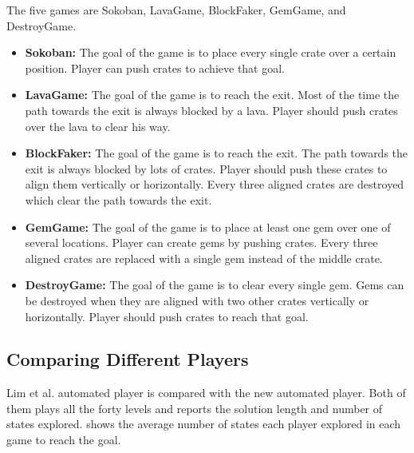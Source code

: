 
The five games are Sokoban, LavaGame, BlockFaker, GemGame, and DestroyGame.
\begin{itemize} \itemsep0pt \parskip0pt 
	\item \textbf{Sokoban:} The goal of the game is to place every single crate over a certain position. Player can push crates to achieve that goal.
	\item \textbf{LavaGame:} The goal of the game is to reach the exit. Most of the time the path towards the exit is always blocked by a lava. Player should push crates over the lava to clear his way.
	\item \textbf{BlockFaker:} The goal of the game is to reach the exit. The path towards the exit is always blocked by lots of crates. Player should push these crates to align them vertically or horizontally. Every three aligned crates are destroyed which clear the path towards the exit.
	\item \textbf{GemGame:} The goal of the game is to place at least one gem over one of several locations. Player can create gems by pushing crates. Every three aligned crates are replaced with a single gem instead of the middle crate.
	\item \textbf{DestroyGame:} The goal of the game is to clear every single gem. Gems can be destroyed when they are aligned with two other crates vertically or horizontally. Player should push crates to reach that goal.
\end{itemize}

\subsection{Comparing Different Players}
Lim et al.\cite{puzzleScriptGeneration} automated player is compared with the new automated player. Both of them plays all the forty levels and reports the solution length and number of states explored.  shows the average number of states each player explored in each game to reach the goal.


